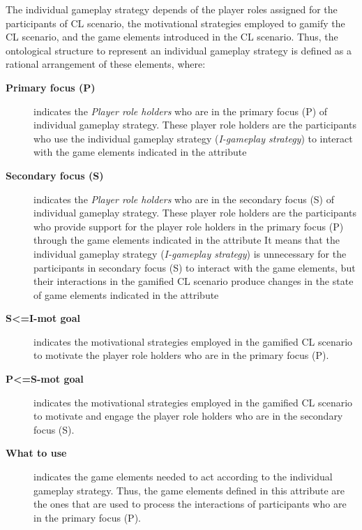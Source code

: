 The individual gameplay strategy depends of the player roles assigned for the participants of CL scenario, the motivational strategies employed to gamify the CL scenario, and the game elements introduced in the CL scenario. 
Thus, the ontological structure to represent an individual gameplay strategy is defined as a rational arrangement of these elements, where:

\begin{description}
\item [\textbf{Primary focus (P)}]
indicates the \emph{Player role holders} who are in the primary focus (P) of individual gameplay strategy.
These player role holders are the participants who use the individual gameplay strategy (\emph{I-gameplay strategy}) to interact with the game elements indicated in the attribute 

\item [\textbf{Secondary focus (S)}]
indicates the \emph{Player role holders} who are in the secondary focus (S) of individual gameplay strategy.
These player role holders are the participants who provide support for the player role holders in the primary focus (P) through the game elements indicated in the attribute 
It means that the individual gameplay strategy (\emph{I-gameplay strategy}) is unnecessary for the participants in secondary focus (S) to interact with the game elements, but their interactions in the gamified CL scenario produce changes in the state of game elements indicated in the attribute 

\item[\textbf{S<=I-mot goal}]
indicates the motivational strategies employed in the gamified CL scenario to motivate the player role holders who are in the primary focus (P).

\item[\textbf{P<=S-mot goal}]
indicates the motivational strategies employed in the gamified CL scenario to motivate and engage the player role holders who are in the secondary focus (S).

\item[\textbf{What to use}]
indicates the game elements needed to act according to the individual gameplay strategy.
Thus, the game elements defined in this attribute are the ones that are used to process the interactions of participants who are in the primary focus (P).
\end{description}

